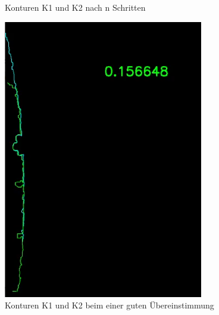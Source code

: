 \begin{figure}[h]
\begin{minipage}{0.24\textwidth}
        \caption{Konturen K1 und K2 nach n Schritten}
        \label{fig:stitching_middle}
    \end{minipage}\hfill
    \begin{minipage}{0.24\textwidth}
        \centering
        \includegraphics[width=\textwidth]{images/stitching_match.PNG} %
        \caption{Konturen K1 und K2 beim einer guten Übereinstimmung}
        \label{fig:stitching_match}
    \end{minipage}\hfill
    \begin{minipage}{0.24\textwidth}
        \centering

\end{minipage}
\end{figure}
